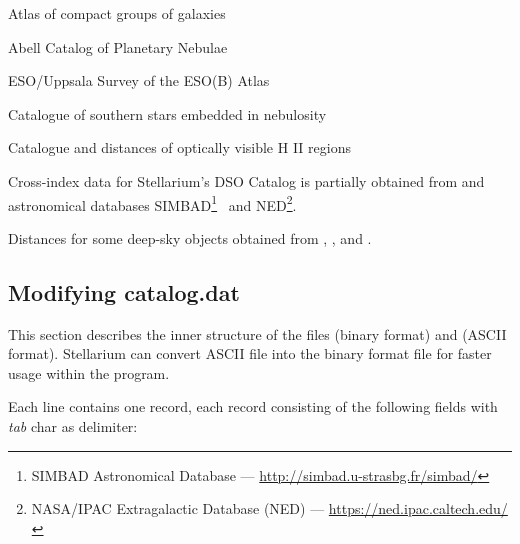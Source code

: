 \begin{description}[align=right,labelwidth=2cm]
\item[\textbf{HCG}]  Atlas of compact groups of galaxies~\citep{1993ApL....29....1H}
\item[\textbf{Abell}]  Abell Catalog of Planetary Nebulae~\citep{1966ApJ...144..259A}
\item[\textbf{ESO}]  ESO/Uppsala Survey of the ESO(B) Atlas~\citep{1982ESO...C......0L}
\item[\textbf{VdBH}]  Catalogue of southern stars embedded in nebulosity~\citep{1975AJ.....80..208V}
\item[\textbf{DWB}]  Catalogue and distances of optically visible H II regions~\citep{1969A&A.....1..270D}
\end{description}

\noindent Cross-index data for Stellarium's DSO Catalog is partially obtained from 
 and astronomical databases 
SIMBAD\footnote{SIMBAD Astronomical Database --- \url{http://simbad.u-strasbg.fr/simbad/}}~\citep{2000A&AS..143....9W} 
and NED\footnote{NASA/IPAC Extragalactic Database (NED) --- \url{https://ned.ipac.caltech.edu/}}.

\noindent Distances for some deep-sky objects obtained from , ,  and .

\subsection{Modifying catalog.dat}
\label{sec:dso:modifyingCatalog.dat}

This section describes the inner structure of the files 
(binary format) and  (ASCII format).
Stellarium can convert ASCII file into the binary format file for faster usage
within the program.

Each line contains one record, each record consisting of the following
fields with \emph{tab} char as delimiter:


